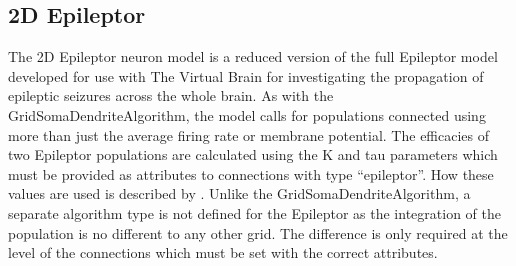 \documentclass[utf8]{frontiers_suppmat} %
\begin{document}
\subsection{2D Epileptor}
The 2D Epileptor neuron model \citep{proix2014permittivity,proix2017individual} is a reduced version of the full Epileptor model \citep{jirsa2014nature} developed for use with The Virtual Brain for investigating the propagation of epileptic seizures across the whole brain. As with the GridSomaDendriteAlgorithm, the model calls for populations connected using more than just the average firing rate or membrane potential. The efficacies of two Epileptor populations are calculated using the K and tau parameters which must be provided as attributes to connections with type ``epileptor''. How these values are used is described by \cite{proix2014permittivity}. Unlike the GridSomaDendriteAlgorithm, a separate algorithm type is not defined for the Epileptor as the integration of the population is no different to any other grid. The difference is only required at the level of the connections which must be set with the correct attributes.
\end{document}
